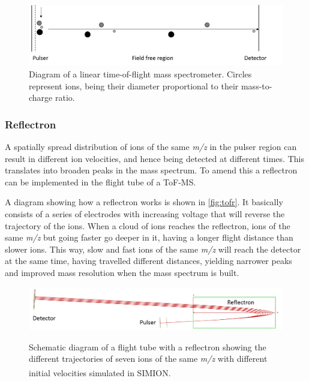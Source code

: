 \begin{figure}%
\centering
\includegraphics[width=0.8\linewidth]{pics/tofms.png}
\centering
\caption[Diagram of a linear time-of-flight mass spectrometer.]{Diagram of a linear time-of-flight mass spectrometer. Circles represent ions, being their diameter proportional to their mass-to-charge ratio.}
\label{fig:tof}
\end{figure}



\subsubsection{Reflectron}
A spatially spread distribution of ions of the same \textit{m/z} in the pulser region can result in different ion velocities, and hence being detected at different times. This translates into broaden peaks in the mass spectrum. To amend this a reflectron can be implemented in the flight tube of a ToF-MS.

A diagram showing how a reflectron works is shown in \autoref{fig:tofr}. It basically consists of a series of electrodes with increasing voltage that will reverse the trajectory of the ions. When a cloud of ions reaches the reflectron, ions of the same \textit{m/z} but going faster go deeper in it, having a longer flight distance than slower ions. This way, slow and fast ions of the same \textit{m/z} will reach the detector at the same time, having travelled different distances, yielding narrower peaks and  improved mass resolution when the mass spectrum is built.

\begin{figure}%
\centering
\includegraphics[width=0.8\linewidth]{pics/reflectron2.png}\label{fig:tofr_sim}
\caption{Schematic diagram of a flight tube with a reflectron showing the different trajectories of seven ions of the same \textit{m/z} with different initial velocities simulated  in SIMION\textsuperscript{\textregistered}.}
\label{fig:tofr}
\end{figure}




